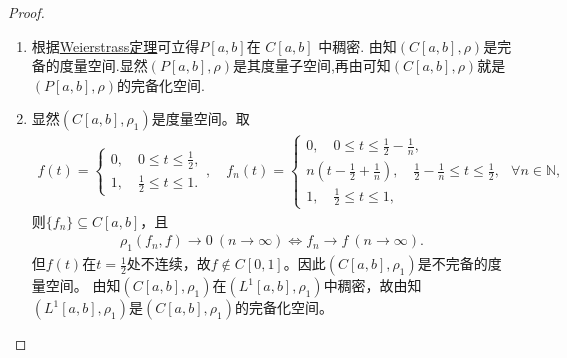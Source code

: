 \documentclass[../../main.tex]{subfiles}%
\begin{document}
\begin{proof}
\begin{enumerate}[(1)]
\item 根据\hyperref[Basis of Analytics-theorem:多项式逼近有限阶光滑函数-Weierstrass逼近定理]{Weierstrass定理}可立得$P[a,b]$在 $C[a,b]$ 中稠密. 由知$(C[a,b],\rho)$是完备的度量空间.显然$(P[a,b],\rho)$是其度量子空间,再由可知$(C[a,b],\rho)$就是$(P[a,b],\rho)$的完备化空间.

\item 显然$(C[a,b],\rho_1)$是度量空间。取
\begin{align*}
f(t)=
\begin{cases}
0,\quad 0\leqslant t\leqslant \frac{1}{2},\\
1,\quad \frac{1}{2}\leqslant t\leqslant 1.
\end{cases},\quad f_n(t)=
\begin{cases}
0,\quad 0\leqslant t\leqslant \frac{1}{2}-\frac{1}{n},\\
n\left(t-\frac{1}{2}+\frac{1}{n}\right),\quad \frac{1}{2}-\frac{1}{n}\leqslant t\leqslant \frac{1}{2},\\
1,\quad \frac{1}{2}\leqslant t\leqslant 1,
\end{cases}
\,\, \forall n\in\mathbb{N},
\end{align*}
则$\{f_n\}\subseteq C[a,b]$，且
\begin{align*}
\rho_1(f_n,f)\to 0\ (n\to\infty)\Longleftrightarrow f_n\to f\ (n\to\infty).
\end{align*}
但$f(t)$在$t=\frac{1}{2}$处不连续，故$f\notin C[0,1]$。因此$(C[a,b],\rho_1)$是不完备的度量空间。
由知$(C[a,b],\rho_1)$在$(L^1[a,b],\rho_1)$中稠密，故由知$(L^1[a,b],\rho_1)$是$(C[a,b],\rho_1)$的完备化空间。
\end{enumerate}
\end{proof}
\end{document}
